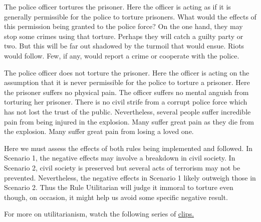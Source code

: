 \documentclass[]{article}
\begin{document}
\begin{description}
\itemsep1pt\parskip0pt
\item[Scenario 1]
The police officer tortures the prisoner. Here the officer is acting as
if it is generally permissible for the police to torture prisoners. What
would the effects of this permission being granted to the police force?
On the one hand, they may stop some crimes using that torture. Perhaps
they will catch a guilty party or two. But this will be far out shadowed
by the turmoil that would ensue. Riots would follow. Few, if any, would
report a crime or cooperate with the police.
\item[Scenario 2]
The police officer does not torture the prisoner. Here the officer is
acting on the assumption that it is never permissible for the police to
torture a prisoner. Here the prisoner suffers no physical pain. The
officer suffers no mental anguish from torturing her prisoner. There is
no civil strife from a corrupt police force which has not lost the trust
of the public. Nevertheless, several people suffer incredible pain from
being injured in the explosion. Many suffer great pain as they die from
the explosion. Many suffer great pain from losing a loved one.
\end{description}

Here we must assess the effects of both rules being implemented and
followed. In Scenario 1, the negative effects may involve a breakdown in
civil society. In Scenario 2, civil society is preserved but several
acts of terrorism may not be prevented. Nevertheless, the negative
effects in Scenario 1 likely outweigh those in Scenario 2. Thus the Rule
Utilitarian will judge it immoral to torture even though, on occasion,
it might help us avoid some specific negative result.

For more on utilitarianism, watch the following series of
\href{https://www.youtube.com/watch?v=uvmz5E75ZIA\&list=PLtKNX4SfKpzWiiUdXS9MKf8bgUfQSOlas}{clips.}
\end{document}
